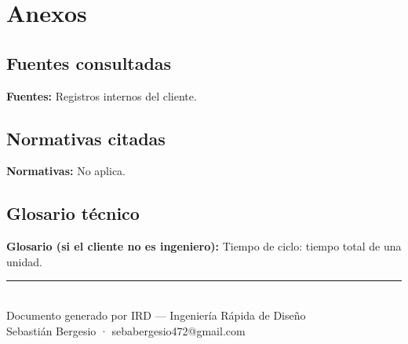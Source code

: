 \documentclass[11pt,a4paper]{article}
\newcommand{\campo}[2]{\textbf{\textcolor{irdblack}{#1:}} \textcolor{irdblack}{#2}\par\vspace{0.3em}}
\begin{document}
\section{Anexos}

\subsection{Fuentes consultadas}
\campo{Fuentes}{Registros internos del cliente.}

\subsection{Normativas citadas}
\campo{Normativas}{No aplica.}

\subsection{Glosario técnico}
\campo{Glosario (si el cliente no es ingeniero)}{Tiempo de ciclo: tiempo total de una unidad.}

\vfill

\begin{center}
{\color{irdorange}\rule{0.5\textwidth}{1pt}}\\[0.3cm]
{\small\color{irdblack} Documento generado por IRD --- Ingeniería Rápida de Diseño}\\
{\small\color{irdblack} Sebastián Bergesio · sebabergesio472@gmail.com}
\end{center}
\end{document}
